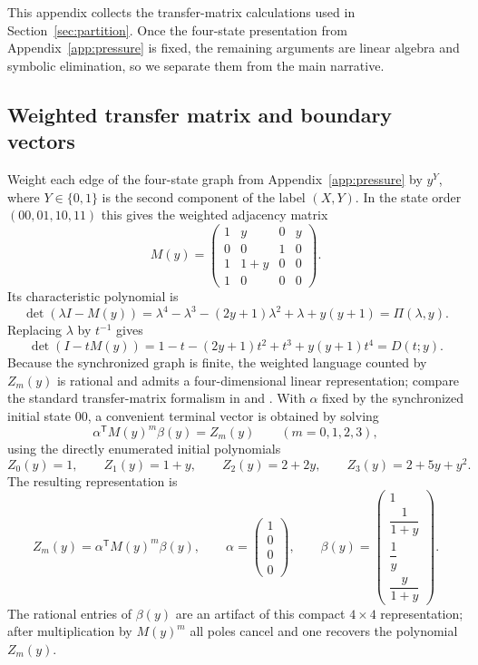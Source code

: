 This appendix collects the transfer-matrix calculations used in Section~\ref{sec:partition}. Once the four-state presentation from Appendix~\ref{app:pressure} is fixed, the remaining arguments are linear algebra and symbolic elimination, so we separate them from the main narrative.

\subsection{Weighted transfer matrix and boundary vectors}
Weight each edge of the four-state graph from Appendix~\ref{app:pressure} by \(y^{Y}\), where \(Y\in\{0,1\}\) is the second component of the label \((X,Y)\). In the state order \((00,01,10,11)\) this gives the weighted adjacency matrix
\[
M(y)=
\begin{pmatrix}
1&y&0&y\\
0&0&1&0\\
1&1+y&0&0\\
1&0&0&0
\end{pmatrix}.
\]
Its characteristic polynomial is
\[
\det(\lambda I-M(y))
=
\lambda^4-\lambda^3-(2y+1)\lambda^2+\lambda+y(y+1)
=
\Pi(\lambda,y).
\]
Replacing \(\lambda\) by \(t^{-1}\) gives
\[
\det(I-tM(y))
=
1-t-(2y+1)t^2+t^3+y(y+1)t^4
=
D(t;y).
\]
Because the synchronized graph is finite, the weighted language counted by \(Z_m(y)\) is rational and admits a four-dimensional linear representation; compare the standard transfer-matrix formalism in \cite[Chapter~6]{AlloucheShallit2003} and \cite{GrabnerKirschenhoferTichy2002}. With \(\alpha\) fixed by the synchronized initial state \(00\), a convenient terminal vector is obtained by solving
\[
\alpha^{\mathsf T}M(y)^m\beta(y)=Z_m(y)\qquad (m=0,1,2,3),
\]
using the directly enumerated initial polynomials
\[
Z_0(y)=1,\qquad
Z_1(y)=1+y,\qquad
Z_2(y)=2+2y,\qquad
Z_3(y)=2+5y+y^2.
\]
The resulting representation is
\[
Z_m(y)=\alpha^{\mathsf T}M(y)^m\beta(y),
\qquad
\alpha=
\begin{pmatrix}
1\\ 0\\ 0\\ 0
\end{pmatrix},
\qquad
\beta(y)=
\begin{pmatrix}
1\\[1mm]
\dfrac{1}{1+y}\\[2mm]
\dfrac{1}{y}\\[2mm]
\dfrac{y}{1+y}
\end{pmatrix}.
\]
The rational entries of \(\beta(y)\) are an artifact of this compact \(4\times4\) representation; after multiplication by \(M(y)^m\) all poles cancel and one recovers the polynomial \(Z_m(y)\).


